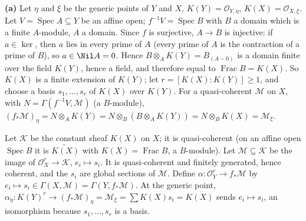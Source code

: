 \documentclass[11pt]{article}
\begin{document}
\pf
\textbf{(a)} Let $\eta$ and $\xi$ be the generic points of $Y$ and $X$, $K(Y)=\mathcal O_{Y,\eta}$, $K(X)=\mathcal O_{X,\xi}$. Let $V=\operatorname{Spec}A\subseteq Y$ be an affine open; $f^{-1}V=\operatorname{Spec}B$ with $B$ a domain which is a finite $A$-module, $A$ a domain. Since $f$ is surjective, $A\to B$ is injective: if $a\in\ker$, then $a$ lies in every prime of $A$ (every prime of $A$ is the contraction of a prime of $B$), so $a\in\Nil A=0$. Hence $B\otimes_AK(Y)=B_{(A-0)}$ is a domain finite over the field $K(Y)$, hence a field, and therefore equal to $\operatorname{Frac}B=K(X)$. So $K(X)$ is a finite extension of $K(Y)$; let $r=[K(X):K(Y)]\ge1$, and choose a basis $s_1,\dots,s_r$ of $K(X)$ over $K(Y)$. For a quasi-coherent $\mathcal M$ on $X$, with $N=\Gamma(f^{-1}V,\mathcal M)$ (a $B$-module), $(f_*\mathcal M)_\eta=N\otimes_AK(Y)=N\otimes_B(B\otimes_AK(Y))=N\otimes_BK(X)=\mathcal M_\xi$.

Let $\mathcal K$ be the constant sheaf $K(X)$ on $X$; it is quasi-coherent (on an affine open $\operatorname{Spec}B$ it is $\widetilde{K(X)}$ with $K(X)=\operatorname{Frac}B$, a $B$-module). Let $\mathcal M\subseteq\mathcal K$ be the image of $\mathcal O_X^r\to\mathcal K$, $e_i\mapsto s_i$. It is quasi-coherent and finitely generated, hence coherent, and the $s_i$ are global sections of $\mathcal M$. Define $\alpha:\mathcal O_Y^r\to f_*\mathcal M$ by $e_i\mapsto s_i\in\Gamma(X,\mathcal M)=\Gamma(Y,f_*\mathcal M)$. At the generic point, $\alpha_\eta:K(Y)^r\to(f_*\mathcal M)_\eta=\mathcal M_\xi=\sum K(X)s_i=K(X)$ sends $e_i\mapsto s_i$, an isomorphism because $s_1,\dots,s_r$ is a basis.
\end{document}
